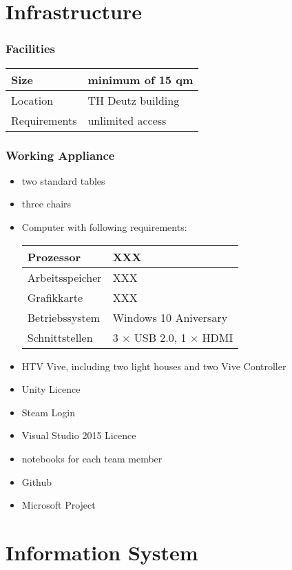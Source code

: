 \documentclass[a4paper, 12pt]{article}
\begin{document}
\section{Infrastructure}
\subsubsection{Facilities}
\begin{tabular}{|l | l | }
	\hline
 Size & minimum of 15 qm \\ \hline
 Location & TH Deutz building \\ \hline
 Requirements & unlimited access\\ 
 \hline
\end{tabular}

\subsubsection{Working Appliance}
\begin{itemize}
	\item two standard tables 
	\item three chairs
	\item Computer with following requirements: \\
\begin{tabular}{|l|l|}
	\hline
	Prozessor & XXX \\
	\hline
	Arbeitsspeicher & XXX \\
	\hline 
	Grafikkarte & XXX\\
	\hline
	Betriebssystem & Windows 10 Aniversary \\
	\hline
	Schnittstellen & 3 $\times$ USB 2.0, 1 $\times$ HDMI \\
	\hline
\end{tabular}
\item HTV Vive, including two light houses and two Vive Controller
\item Unity Licence
\item Steam Login
\item Visual Studio 2015 Licence
\item notebooks for each team member
\item Github
\item Microsoft Project
\end{itemize}

\section{Information System}
\end{document}
